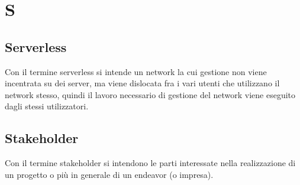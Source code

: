\section{S}
	\subsection{Serverless} 
		Con il termine serverless si intende un network la cui gestione non viene incentrata su dei server, ma viene dislocata fra i vari utenti che utilizzano il network stesso, quindi il lavoro necessario di gestione del network viene eseguito dagli stessi utilizzatori.
	\subsection{Stakeholder}  
		Con il termine stakeholder si intendono le parti interessate nella realizzazione di un progetto o più in generale di un endeavor (o impresa).


\newpage